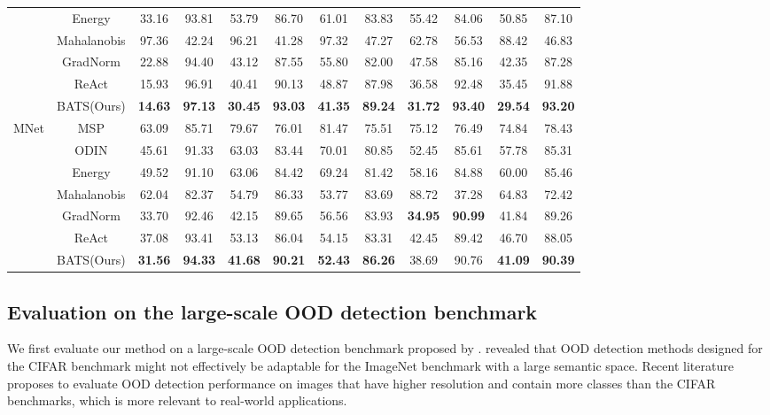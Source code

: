 \documentclass{article}
\begin{document}
\begin{table}[htbp]
{\begin{tabular}{cccccccccccc}
 & Energy\cite{liu2020energy} & 33.16 & 93.81 & 53.79 & 86.70 & 61.01 & 83.83 & 55.42 & 84.06 & 50.85 & 87.10 \\ 
 & Mahalanobis\cite{Mahalanobis} & 97.36 & 42.24 & 96.21 & 41.28 & 97.32 & 47.27 & 62.78 & 56.53 & 88.42 & 46.83 \\ 
 & GradNorm\cite{huang2021importance} & 22.88 & 94.40 & 43.12 & 87.55 & 55.80 & 82.00 & 47.58 & 85.16 & 42.35 & 87.28 \\  
 & ReAct\cite{sun2021react} & 15.93 & 96.91 & 40.41 & 90.13 & 48.87 & 87.98 & 36.58 & 92.48 & 35.45 & 91.88 \\ 
 & BATS(Ours) & \textbf{14.63} & \textbf{97.13} & \textbf{30.45} & \textbf{93.03} & \textbf{41.35} & \textbf{89.24} & \textbf{31.72} & \textbf{93.40} & \textbf{29.54} & \textbf{93.20} \\ \hline
\multirow{7}{*}{MNet} & MSP\cite{hendrycks17baseline} & 63.09 & 85.71 & 79.67 & 76.01 & 81.47 & 75.51 & 75.12 & 76.49 & 74.84 & 78.43 \\
 & ODIN\cite{ODIN} & 45.61 & 91.33 & 63.03 & 83.44 & 70.01 & 80.85 & 52.45 & 85.61 & 57.78 & 85.31 \\
 & Energy\cite{liu2020energy} & 49.52 & 91.10 & 63.06 & 84.42 & 69.24 & 81.42 & 58.16 & 84.88 & 60.00 & 85.46 \\
 & Mahalanobis\cite{Mahalanobis} & 62.04 & 82.37 & 54.79 & 86.33 & 53.77 & 83.69 & 88.72 & 37.28 & 64.83 & 72.42 \\
 & GradNorm\cite{huang2021importance} & 33.70 & 92.46 & 42.15 & 89.65 & 56.56 & 83.93 & \textbf{34.95} & \textbf{90.99} & 41.84 & 89.26 \\
 & ReAct\cite{sun2021react} & 37.08 & 93.41 & 53.13 & 86.04 & 54.15 & 83.31 & 42.45 & 89.42 & 46.70 & 88.05 \\
 & BATS(Ours) & \textbf{31.56} & \textbf{94.33} & \textbf{41.68} & \textbf{90.21} & \textbf{52.43} & \textbf{86.26} & 38.69 & 90.76 & \textbf{41.09} & \textbf{90.39} \\ \hline \end{tabular}\label{tab:imagenet}}
\end{table}



\subsection{Evaluation on the large-scale OOD detection benchmark}
We first evaluate our method on a large-scale OOD detection benchmark proposed by \citet{huang2021mos}. \cite{huang2021mos} revealed that OOD detection methods designed for the CIFAR benchmark might not effectively be adaptable for the ImageNet benchmark with a large semantic space.
Recent {literature} \cite{sun2021react,huang2021importance,huang2021mos} proposes to evaluate OOD detection performance on images that have higher resolution and contain more classes than the CIFAR benchmarks, which is more relevant to real-world applications.
\end{document}
